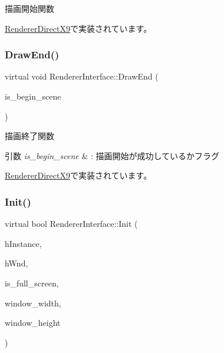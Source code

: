 描画開始関数 



\mbox{\hyperlink{class_renderer_direct_x9_a5113bf4e6aefdb7bcab2016fbbee0174}{Renderer\+Direct\+X9}}で実装されています。

\mbox{\label{class_renderer_interface_a0034a44420e4746062e70e4d66d3bee2}} 
\subsubsection{\texorpdfstring{Draw\+End()}{DrawEnd()}}
{\footnotesize\ttfamily virtual void Renderer\+Interface\+::\+Draw\+End (\begin{DoxyParamCaption}\item[{bool}]{is\+\_\+begin\+\_\+scene }\end{DoxyParamCaption})\hspace{0.3cm}{\ttfamily [pure virtual]}}



描画終了関数 


\begin{DoxyParams}{引数}
{\em is\+\_\+begin\+\_\+scene} & \+: 描画開始が成功しているかフラグ \\
\hline
\end{DoxyParams}


\mbox{\hyperlink{class_renderer_direct_x9_a5f934597020f77dc9cf729acfb13a830}{Renderer\+Direct\+X9}}で実装されています。

\mbox{\label{class_renderer_interface_aabef76c27c2332c1af2dbcf7e8de5d38}} 
\subsubsection{\texorpdfstring{Init()}{Init()}}
{\footnotesize\ttfamily virtual bool Renderer\+Interface\+::\+Init (\begin{DoxyParamCaption}\item[{H\+I\+N\+S\+T\+A\+N\+CE}]{h\+Instance,  }\item[{H\+W\+ND}]{h\+Wnd,  }\item[{B\+O\+OL}]{is\+\_\+full\+\_\+screen,  }\item[{int}]{window\+\_\+width,  }\item[{int}]{window\+\_\+height }\end{DoxyParamCaption})\hspace{0.3cm}{\ttfamily [pure virtual]}}




